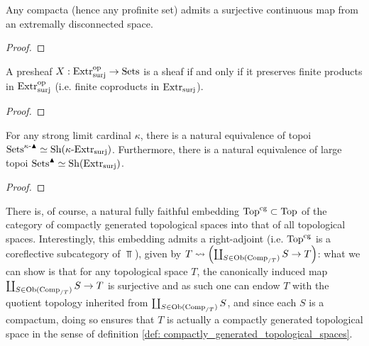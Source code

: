            \begin{lemma} \label{lemma: surjections_from_extremally_disconnected_spaces_to_compacta}
                Any compacta (hence any profinite set) admits a surjective continuous map from an extremally disconnected space.
            \end{lemma}
                \begin{proof}
                    
                \end{proof}
            \begin{corollary} \label{corollary: simplified_sheaf_condition_for_extremally_disconnected_spaces}
                A presheaf $X: \mathrm{Extr}_{\mathrm{surj}}^{\mathrm{op}} \to \mathrm{Sets}$ is a sheaf if and only if it preserves finite products in $\mathrm{Extr}_{\mathrm{surj}}^{\mathrm{op}}$ (i.e. finite coproducts in $\mathrm{Extr}_{\mathrm{surj}}$).
            \end{corollary}
                \begin{proof}
                    
                \end{proof}
            \begin{proposition} \label{prop: condensed_sets_are_sheaves_on_extremally_disconnected_spaces}
                For any strong limit cardinal $\kappa$, there is a natural equivalence of topoi $\mathrm{Sets}^{\kappa\text{-}\blacktriangle} \simeq \mathrm{Sh}(\kappa\text{-}\mathrm{Extr}_{\mathrm{surj}})$. Furthermore, there is a natural equivalence of large topoi $\mathrm{Sets}^{\blacktriangle} \simeq \mathrm{Sh}(\mathrm{Extr}_{\mathrm{surj}})$.
            \end{proposition}
                \begin{proof}
                    
                \end{proof}
            \begin{remark}
                There is, of course, a natural fully faithful embedding $\mathrm{Top}^{\mathrm{cg}} \subset \mathrm{Top}$ of the category of compactly generated topological spaces into that of all topological spaces. Interestingly, this embedding admits a right-adjoint (i.e. $\mathrm{Top}^{\mathrm{cg}}$ is a coreflective subcategory of $\Top$), given by $T \leadsto \left(\coprod_{S \in \mathrm{Ob}(\mathrm{Comp}_{/T})} S \to T\right)$: what we can show is that for any topological space $T$, the canonically induced map $\coprod_{S \in \mathrm{Ob}(\mathrm{Comp}_{/T})} S \to T$ is surjective and as such one can endow $T$ with the quotient topology inherited from $\coprod_{S \in \mathrm{Ob}(\mathrm{Comp}_{/T})} S$, and since each $S$ is a compactum, doing so ensures that $T$ is actually a compactly generated topological space in the sense of definition \ref{def: compactly_generated_topological_spaces}. 
            \end{remark}
